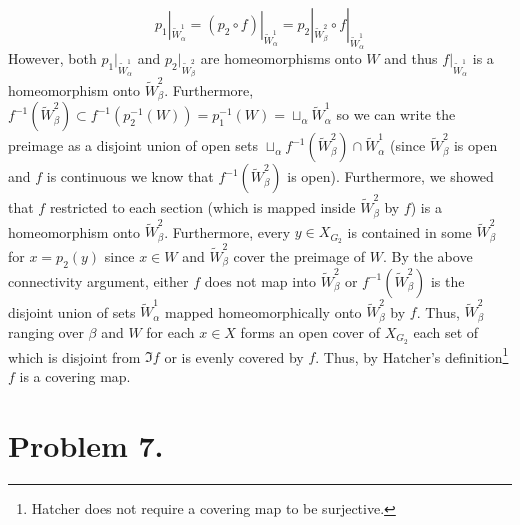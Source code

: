 \documentclass[12pt]{extarticle}
\begin{document}
\[p_1 |_{\tilde{W}^1_{\alpha}} = (p_2 \circ f)|_{\tilde{W}^1_{\alpha}} = p_2|_{\tilde{W}^2_{\beta}} \circ f|_{\tilde{W}^1_{\alpha}} \] 
However, both $p_1 |_{\tilde{W}^1_{\alpha}}$ and $p_2|_{\tilde{W}^2_{\beta}}$ are homeomorphisms onto $W$ and thus $f|_{\tilde{W}^1_{\alpha}}$ is a homeomorphism onto $\tilde{W}^2_{\beta}$. Furthermore, $f^{-1}(\tilde{W}^2_{\beta}) \subset f^{-1}(p_2^{-1}(W)) = p_1^{-1}(W) = \sqcup_{\alpha} \tilde{W}^1_{\alpha}$ so we can write the preimage as a disjoint union of open sets $\sqcup_{\alpha} f^{-1}(\tilde{W}^2_{\beta}) \cap \tilde{W}^1_{\alpha}$ (since $\tilde{W}_{\beta}^2$ is open and $f$ is continuous we know that $f^{-1}(\tilde{W}_{\beta}^2)$ is open). Furthermore, we showed that $f$ restricted to each section (which is mapped inside $\tilde{W}^2_{\beta}$ by $f$) is a homeomorphism onto $\tilde{W}^2_{\beta}$. Furthermore, every $y \in X_{G_2}$ is contained in some $\tilde{W}^2_{\beta}$ for $x = p_2(y)$ since $x \in W$ and $\tilde{W}^2_{\beta}$ cover the preimage of $W$. By the above connectivity argument, either $f$ does not map into $\tilde{W}^2_{\beta}$ or $f^{-1}(\tilde{W}^2_{\beta})$ is the disjoint union of sets $\tilde{W}^1_{\alpha}$ mapped homeomorphically onto $\tilde{W}^2_{\beta}$ by $f$. Thus, $\tilde{W}^2_{\beta}$ ranging over $\beta$ and $W$ for each $x \in X$ forms an open cover of $X_{G_2}$ each set of which is disjoint from $\Im{f}$ or is evenly covered by $f$. Thus, by Hatcher's definition\footnote{Hatcher does not require a covering map to be surjective.} $f$ is a covering map.  

\section*{Problem 7.}

\newcommand{\SU}[1]{\mathrm{SU}(#1)}
\newcommand{\SO}[1]{\mathrm{SO}(#1)}
\end{document}
